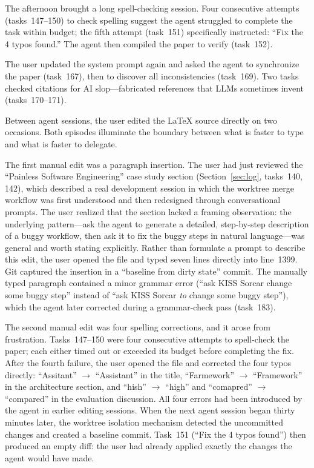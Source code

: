 \documentclass{article}
\begin{document}
The afternoon brought a long spell-checking session.  Four consecutive attempts (tasks~147--150) to check spelling suggest the agent struggled to complete the task within budget; the fifth attempt (task~151) specifically instructed: ``Fix the 4 typos found.''  The agent then compiled the paper to verify (task~152).

The user updated the system prompt again and asked the agent to synchronize the paper (task~167), then to discover all inconsistencies (task~169).  Two tasks checked citations for AI slop---fabricated references that LLMs sometimes invent (tasks~170--171).

Between agent sessions, the user edited the \LaTeX{} source directly on two occasions.  Both episodes illuminate the boundary between what is faster to type and what is faster to delegate.

The first manual edit was a paragraph insertion.  The user had just reviewed the ``Painless Software Engineering'' case study section (Section~\ref{sec:log}, tasks~140, 142), which described a real development session in which the worktree merge workflow was first understood and then redesigned through conversational prompts.  The user realized that the section lacked a framing observation: the underlying pattern---ask the agent to generate a detailed, step-by-step description of a buggy workflow, then ask it to fix the buggy steps in natural language---was general and worth stating explicitly.  Rather than formulate a prompt to describe this edit, the user opened the file and typed seven lines directly into line~1399.  Git captured the insertion in a ``baseline from dirty state'' commit.  The manually typed paragraph contained a minor grammar error (``ask KISS Sorcar change some buggy step'' instead of ``ask KISS Sorcar \emph{to} change some buggy step''), which the agent later corrected during a grammar-check pass (task~183).

The second manual edit was four spelling corrections, and it arose from frustration.  Tasks~147--150 were four consecutive attempts to spell-check the paper; each either timed out or exceeded its budget before completing the fix.  After the fourth failure, the user opened the file and corrected the four typos directly: ``Assitant'' $\to$ ``Assistant'' in the title, ``Farmework'' $\to$ ``Framework'' in the architecture section, and ``hish'' $\to$ ``high'' and ``comapred'' $\to$ ``compared'' in the evaluation discussion.  All four errors had been introduced by the agent in earlier editing sessions.  When the next agent session began thirty minutes later, the worktree isolation mechanism detected the uncommitted changes and created a baseline commit.  Task~151 (``Fix the 4 typos found'') then produced an empty diff: the user had already applied exactly the changes the agent would have made.
\end{document}
